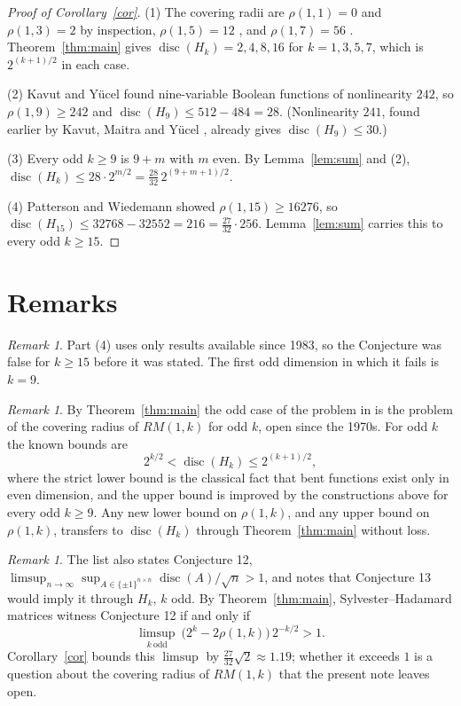 \documentclass[11pt]{amsart}
\theoremstyle{remark}
\newtheorem{remark}[theorem]{Remark}
\newcommand{\disc}{\operatorname{disc}}
\begin{document}
\begin{proof}[Proof of Corollary~\ref{cor}]
(1) The covering radii are $\rho(1,1)=0$ and $\rho(1,3)=2$ by inspection,
$\rho(1,5)=12$ \cite{BW}, and $\rho(1,7)=56$ \cite{Mykkeltveit}. Theorem~\ref{thm:main}
gives $\disc(H_k)=2,4,8,16$ for $k=1,3,5,7$, which is $2^{(k+1)/2}$ in each case.

(2) Kavut and Y\"ucel \cite{KY} found nine-variable Boolean functions of
nonlinearity $242$, so $\rho(1,9)\ge242$ and
$\disc(H_9)\le 512-484=28$. (Nonlinearity $241$, found earlier by Kavut, Maitra
and Y\"ucel \cite{KMY}, already gives $\disc(H_9)\le30$.)

(3) Every odd $k\ge9$ is $9+m$ with $m$ even. By Lemma~\ref{lem:sum} and (2),
$\disc(H_k)\le 28\cdot 2^{m/2}=\tfrac{28}{32}\,2^{(9+m+1)/2}$.

(4) Patterson and Wiedemann \cite{PW} showed $\rho(1,15)\ge16276$, so
$\disc(H_{15})\le 32768-32552=216=\tfrac{27}{32}\cdot 256$. Lemma~\ref{lem:sum}
carries this to every odd $k\ge15$.
\end{proof}

\section{Remarks}

\begin{remark}
Part (4) uses only results available since 1983, so the Conjecture was false for
$k\ge15$ before it was stated. The first odd dimension in which it fails is $k=9$.
\end{remark}

\begin{remark}
By Theorem~\ref{thm:main} the odd case of the problem in \cite{RS101} is the
problem of the covering radius of $RM(1,k)$ for odd $k$, open since the 1970s.
For odd $k$ the known bounds are
\[
2^{k/2}<\disc(H_k)\le 2^{(k+1)/2},
\]
where the strict lower bound is the classical fact that bent functions exist only in
even dimension, and the upper bound is improved by the constructions above for every
odd $k\ge9$. Any new lower bound on $\rho(1,k)$, and any upper bound on
$\rho(1,k)$, transfers to $\disc(H_k)$ through Theorem~\ref{thm:main} without loss.
\end{remark}

\begin{remark}
The list \cite{RS101} also states Conjecture 12,
$\limsup_{n\to\infty}\sup_{A\in\{\pm1\}^{n\times n}}\disc(A)/\sqrt n>1$, and
notes that Conjecture 13 would imply it through $H_k$, $k$ odd. By
Theorem~\ref{thm:main}, Sylvester--Hadamard matrices witness Conjecture 12 if and
only if
\[
\limsup_{k\ \mathrm{odd}}\ \bigl(2^k-2\rho(1,k)\bigr)\,2^{-k/2}>1 .
\]
Corollary~\ref{cor} bounds this $\limsup$ by $\tfrac{27}{32}\sqrt2\approx1.19$; whether it
exceeds $1$ is a question about the covering radius of $RM(1,k)$ that the present
note leaves open.
\end{remark}
\end{document}

